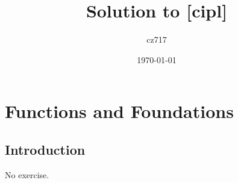 \documentclass[a4paper]{report}
\begin{document}
  \title{Solution to [cipl]}
  \author{cz717}
  \date{\today}
  \maketitle



\part{Functions and Foundations}
  \chapter{Introduction}
    No exercise.
  
   
  
\end{document}
